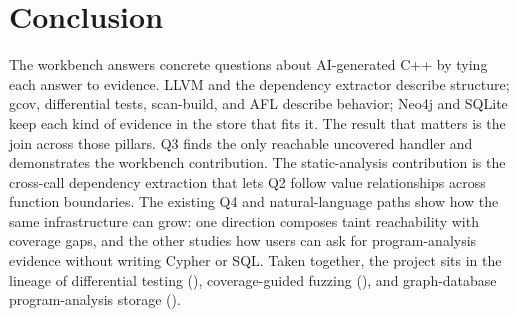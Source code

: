 \documentclass[11pt,twocolumn]{article}
\begin{document}
\section{Conclusion}

The workbench answers concrete questions about AI-generated C++ by tying each
answer to evidence. LLVM and the dependency extractor describe structure;
gcov, differential tests, scan-build, and AFL describe behavior; Neo4j and
SQLite keep each kind of evidence in the store that fits it. The result that
matters is the join across those pillars. Q3 finds the only reachable uncovered
handler and demonstrates the workbench contribution. The static-analysis
contribution is the cross-call dependency extraction that lets Q2 follow value
relationships across function boundaries. The existing Q4 and natural-language
paths show how the same infrastructure can grow: one direction composes taint
reachability with coverage gaps, and the other studies how users can ask for
program-analysis evidence without writing Cypher or SQL.
Taken together, the project sits in the lineage of differential testing
(\cite{mckeeman}), coverage-guided fuzzing (\cite{aflpp}), and graph-database
program-analysis storage (\cite{neo4j}).
\end{document}
